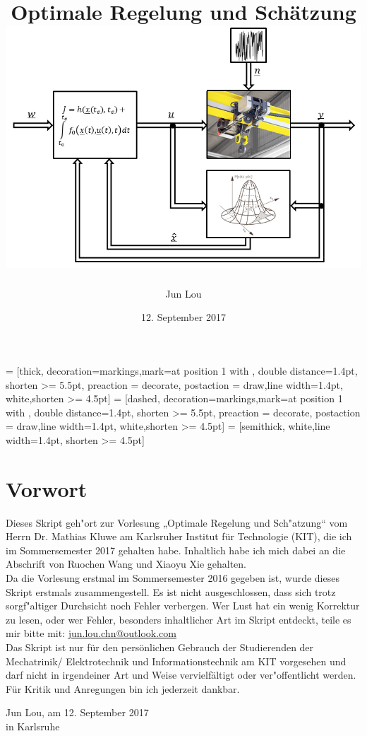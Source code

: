 \documentclass[openany,a4paper,11pt]{book}
\author{Jun Lou}
\date{12. September 2017}
\title{\Huge \textbf{Optimale Regelung und Schätzung} \\[2cm] \protect \includegraphics[width=\textwidth]{ors.png}}
\begin{document}

 = [thick, decoration={markings,mark=at position
1 with {}},
double distance=1.4pt, shorten >= 5.5pt,
preaction = {decorate},
postaction = {draw,line width=1.4pt, white,shorten >= 4.5pt}]
 = [dashed, decoration={markings,mark=at position
1 with {}},
double distance=1.4pt, shorten >= 5.5pt,
preaction = {decorate},
postaction = {draw,line width=1.4pt, white,shorten >= 4.5pt}]  
 = [semithick, white,line width=1.4pt, shorten >= 4.5pt]


\newcommand\encircle[1]{%
\tikz[baseline=(X.base)] \node (X) [draw, shape=circle, inner sep=0] {\strut #1};}

\pagestyle{plain}
\maketitle
\tableofcontents
\setcounter{page}{1}
\frontmatter
{}
\chapter*{Vorwort}   
Dieses Skript geh"ort zur Vorlesung „Optimale Regelung und Sch"atzung“ vom Herrn Dr. Mathias Kluwe am Karlsruher Institut für Technologie (KIT), die ich im Sommersemester 2017 gehalten habe. Inhaltlich habe ich mich dabei an die Abschrift von Ruochen Wang und Xiaoyu Xie gehalten. \\[5pt]
Da die Vorlesung erstmal im Sommersemester 2016 gegeben ist, wurde dieses Skript erstmals zusammengestell. Es ist nicht
ausgeschlossen, dass sich trotz sorgf"altiger Durchsicht noch Fehler verbergen. Wer Lust hat ein wenig Korrektur zu lesen, oder wer Fehler, besonders inhaltlicher Art im Skript entdeckt, teile es mir bitte mit: {\color{blue}\href{mailto:jun.lou.chn@outlook.com}{jun.lou.chn@outlook.com}}\\[5pt]
Das Skript ist nur für den persönlichen Gebrauch der Studierenden der Mechatrinik/ Elektrotechnik und Informationstechnik am KIT vorgesehen und darf nicht in irgendeiner Art und Weise vervielfältigt oder ver"offentlicht werden. \\[5pt]
Für Kritik und Anregungen bin ich jederzeit dankbar.\\[6pt]
\begin{flushright} Jun Lou, am 12. September 2017\\
in Karlsruhe\end{flushright}
\setcounter{page}{1}
\mainmatter
\end{document}

